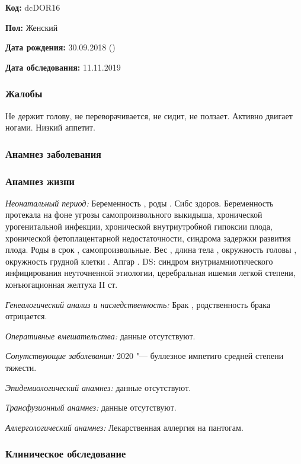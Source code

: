 \documentclass[a4paper,14pt]{extarticle}
\newcommand{\gramm}{г}
\newcommand{\cm}{см}
\newcommand{\weeks}{нед.}
\begin{document}
\textbf{Код:} dcDOR16 

\textbf{Пол:} Женский

\textbf{Дата рождения:} 30.09.2018 ()

\textbf{Дата обследования:} 11.11.2019

\subsubsection*{Жалобы}

Не держит голову, не переворачивается, не сидит, не ползает. Активно двигает ногами. Низкий аппетит.

\subsubsection*{Анамнез заболевания}

\subsubsection*{Анамнез жизни}

\emph{Неонатальный период:} Беременность , роды . Сибс здоров. Беременность протекала на фоне угрозы самопроизвольного выкидыша, хронической урогенитальной инфекции, хронической внутриутробной гипоксии плода, хронической фетоплацентарной недостаточности, синдрома задержки развития плода. Роды в срок \numprint[\weeks]{39}, самопроизвольные. Вес \numprint[\gramm]{2860}, длина тела \numprint[\cm]{49}, окружность головы \numprint[\cm]{33}, окружность грудной клетки \numprint[\cm]{30}. Апгар . DS: синдром внутриамниотического инфицирования неуточненной этиологии, церебральная ишемия легкой степени, конъюгационная желтуха II ст.

\emph{Генеалогический анализ и наследственность:} Брак , родственность брака отрицается.

\emph{Оперативные вмешательства:} данные отсутствуют.

\emph{Сопутствующие заболевания:} 2020 "--- буллезное импетиго средней степени тяжести.

\emph{Эпидемиологический анамнез:} данные отсутствуют.

\emph{Трансфузионный анамнез:} данные отсутствуют.

\emph{Аллергологический анамнез:} Лекарственная аллергия на пантогам.

\subsubsection*{Клиническое обследование}
\end{document}

